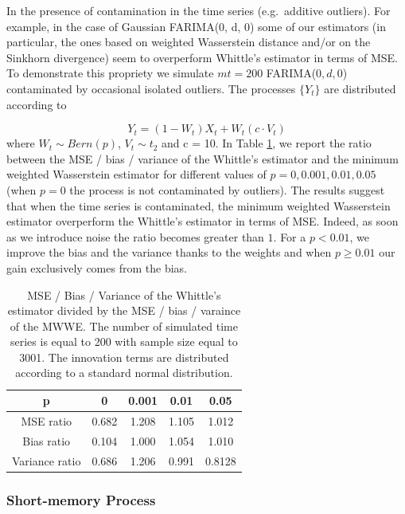 \documentclass[
  11pt,
]{article}
\begin{document}
In the presence of contamination in the time series (e.g.~additive
outliers). For example, in the case of Gaussian FARIMA(0, d, 0) some of
our estimators (in particular, the ones based on weighted Wasserstein
distance and/or on the Sinkhorn divergence) seem to overperform
Whittle's estimator in terms of MSE. To demonstrate this propriety we
simulate \(mt = 200\) FARIMA(\(0,d,0\)) contaminated by occasional
isolated outliers. The processes \(\{Y_t\}\) are distributed according
to

\[Y_{t}=\left(1-W_{t}\right) X_{t}+W_{t}\left(c \cdot V_{t}\right)\]
where \(W_t \sim Bern(p)\), \(V_t \sim t_2\) and c = 10. In Table
\ref{tab:outliers}, we report the ratio between the MSE / bias /
variance of the Whittle's estimator and the minimum weighted Wasserstein
estimator for different values of \(p = 0, 0.001, 0.01, 0.05\) (when
\(p = 0\) the process is not contaminated by outliers). The results
suggest that when the time series is contaminated, the minimum weighted
Wasserstein estimator overperform the Whittle's estimator in terms of
MSE. Indeed, as soon as we introduce noise the ratio becomes greater
than \(1\). For a \(p < 0.01\), we improve the bias and the variance
thanks to the weights and when \(p \geq 0.01\) our gain exclusively
comes from the bias.

\begin{table}[h]
\centering
\begin{tabular}{|c|c|c|c|c|}
\hline
p  &  0  & 0.001   & 0.01    & 0.05 \\
\hline
MSE ratio  & 0.682 & 1.208 & 1.105 & 1.012 \\
\hline
Bias ratio & 0.104 & 1.000 & 1.054 & 1.010\\
\hline 
Variance ratio & 0.686 & 1.206 & 0.991 & 0.8128 \\ 
\hline
\end{tabular}
\caption{MSE / Bias / Variance of the Whittle's estimator divided by the MSE / bias / varaince of the MWWE. The number of simulated time series is equal to 200 with sample size equal to 3001. The innovation terms are distributed according to a standard normal distribution.}
\label{tab:outliers}
\end{table}

\hypertarget{short-memory-process}{%
\subsubsection{Short-memory Process}\label{short-memory-process}}
\end{document}
